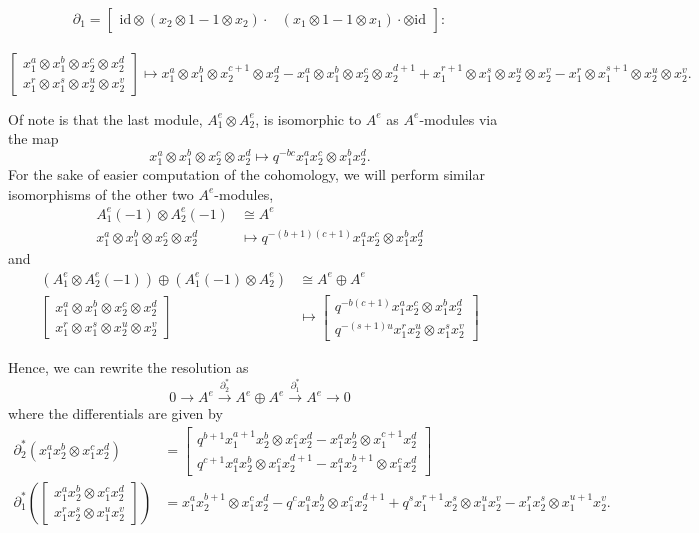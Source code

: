 \documentclass[12pt,a4paper]{article}
\newcommand\1{_{(1)}}
\newcommand\2{_{(2)}}
\begin{document}
\newpage
\[\partial_1=\begin{bmatrix}\text{id}\otimes(x_2\otimes 1-1\otimes x_2)\cdot&(x_1\otimes 1-1\otimes x_1)\cdot\otimes\text{id}\end{bmatrix}:\]\\
\[\begin{bmatrix}x_1^a\otimes x_1^b\otimes x_2^c\otimes x_2^d\\x_1^r\otimes x_1^s\otimes x_2^u\otimes x_2^v\end{bmatrix}\mapsto x_1^a\otimes x_1^b\otimes x_2^{c+1}\otimes x_2^d-x_1^a\otimes x_1^b\otimes x_2^c\otimes x_2^{d+1}
+ x_1^{r+1}\otimes x_1^s\otimes x_2^u\otimes x_2^v-x_1^r\otimes x_1^{s+1}\otimes x_2^u\otimes x_2^v.
\]

Of note is that the last module, $A_1^e\otimes A_2^e$, is isomorphic to $A^e$ as $A^e$-modules via the map
\[
x_1^a\otimes x_1^b\otimes x_2^c\otimes x_2^d\mapsto q^{-bc} x_1^ax_2^c\otimes x_1^bx_2^d.  
\]
For the sake of easier computation of the cohomology, we will perform similar isomorphisms of the other two $A^e$-modules,
\begin{align*}
A^e_1(-1)\otimes A^e_2(-1)&\cong A^e\\
x_1^a\otimes x_1^b\otimes x_2^c\otimes x_2^d&\mapsto q^{-(b+1)(c+1)}x_1^ax_2^c\otimes x_1^bx_2^d
\end{align*}
and
\begin{align*}
\left(A^e_1\otimes A^e_2(-1)\right)\oplus\left(A^e_1(-1)\otimes A^e_2\right)&\cong A^e\oplus A^e\\
\begin{bmatrix} x_1^a\otimes x_1^b\otimes x_2^c\otimes x_2^d\\x_1^r\otimes x_1^s\otimes x_2^u\otimes x_2^v\end{bmatrix}&\mapsto\begin{bmatrix}q^{-b(c+1)}x_1^ax_2^c\otimes x_1^bx_2^d\\q^{-(s+1)u}x_1^rx_2^u\otimes x_1^sx_2^v \end{bmatrix}
\end{align*}

Hence, we can rewrite the resolution as
\[
0\to A^e\xrightarrow{\partial^*_2}A^e\oplus A^e\xrightarrow{\partial^*_1}A^e\to 0
\]
where the differentials are given by
\begin{align*}
\partial^*_2\left(x_1^ax_2^b\otimes x_1^cx_2^d\right)&=\begin{bmatrix}q^{b+1}x_1^{a+1}x_2^b\otimes x_1^cx_2^d-x_1^ax_2^b\otimes x_1^{c+1}x_2^d\\q^{c+1}x_1^ax_2^b\otimes x_1^cx_2^{d+1}-x_1^ax_2^{b+1}\otimes x_1^cx_2^d \end{bmatrix}\\
\partial^*_1\left(\begin{bmatrix}x_1^ax_2^b\otimes x_1^cx_2^d\\ x_1^rx_2^s\otimes x_1^ux_2^v\end{bmatrix}\right)&=x_1^ax_2^{b+1}\otimes x_1^cx_2^d-q^{c}x_1^ax_2^b\otimes x_1^cx_2^{d+1}+q^{s}x_1^{r+1}x_2^s\otimes x_1^ux_2^v-x_1^rx_2^s\otimes x_1^{u+1}x_2^v.
\end{align*}
\end{document}
